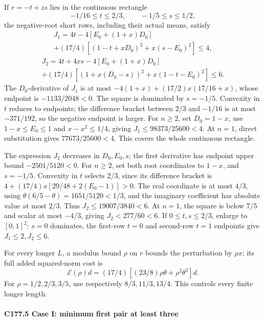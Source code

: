 If \(r=-t+zs\) lies in the continuous rectangle
\[
-1/16\le t\le2/3,\qquad-1/5\le s\le1/2,               \tag{C177.T184.19}
\]
the negative-root short rows, including their actual means, satisfy
\[
\begin{gathered}
J_1=4t-4[E_0+(1+x)D_0]\\
+(17/4)[(1-t+xD_0)^2+x(s-E_0)^2]\le4,
\end{gathered}\tag{C177.T184.20}
\]
\[
\begin{gathered}
J_2=4t+4xs-4[E_0+(1+x)D_0]\\
+(17/4)[(1+x(D_0-s))^2+x(1-t-E_0)^2]\le6.
\end{gathered}\tag{C177.T184.21}
\]
The \(D_0\)-derivative of \(J_1\) is at most \(-4(1+x)+(17/2)x(17/16+x)\), whose endpoint is \(-1133/2048<0\). The square is dominated by \(s=-1/5\). Convexity in \(t\) reduces to endpoints; the difference bracket between \(2/3\) and \(-1/16\) is at most \(-371/192\), so the negative endpoint is larger. For \(n\ge2\), set \(D_0=1-x\), use \(1-x\le E_0\le1\) and \(x-x^2\le1/4\), giving \(J_1\le98373/25600<4\). At \(n=1\), direct substitution gives \(77673/25600<4\). This covers the whole continuous rectangle.

The expression \(J_2\) decreases in \(D_0,\allowbreak \allowbreak  E_0,\allowbreak \allowbreak  s\); the first derivative has endpoint upper bound \(-2501/5120<0\). For \(n\ge2\), set both root coordinates to \(1-x\), and \(s=-1/5\). Convexity in \(t\) selects \(2/3\), since its difference bracket is \(4+(17/4)x[29/48+2(E_0-1)]>0\). The real coordinate is at most \(4/3\), using \(\theta(6/5-\theta)=1651/5120<1/3\), and the imaginary coefficient has absolute value at most \(2/3\). Thus \(J_2\le19007/3840<6\). At \(n=1\), the square is below \(7/5\) and scalar at most \(-4/3\), giving \(J_2<277/60<6\). If \(0\le t,\allowbreak \allowbreak  s\le2/3\), enlarge to \([0,\allowbreak \allowbreak  1]^2\): \(s=0\) dominates, the first-row \(t=0\) and second-row \(t=1\) endpoints give \(J_1\le2,\allowbreak \allowbreak  J_2\le6\).

For every longer \(L\), a modulus bound \(\rho\) on \(r\) bounds the perturbation by \(\rho x\); its full added squared-norm cost is
\[
\mathcal E(\rho)d=(17/4)[(23/8)\rho\theta+\rho^2\theta^2]d. \tag{C177.T184.22}
\]
For \(\rho=1/2,\allowbreak \allowbreak  2/3,\allowbreak \allowbreak  3/5\), use respectively \(8/3,\allowbreak \allowbreak  11/3,\allowbreak \allowbreak  13/4\). This controls every finite longer length.

\paragraph{C177.5 Case I: minimum first pair at least three}

